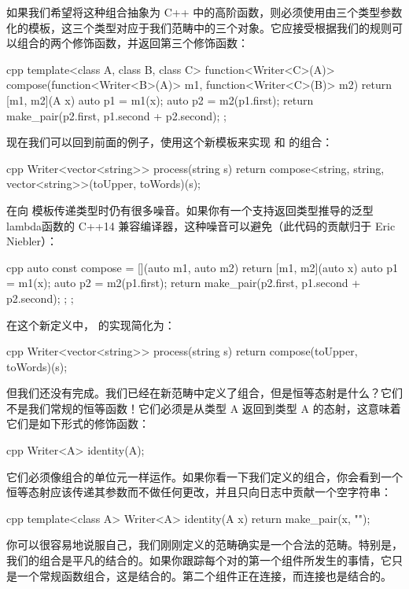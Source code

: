 如果我们希望将这种组合抽象为 C++ 中的高阶函数，则必须使用由三个类型参数化的模板，这三个类型对应于我们范畴中的三个对象。它应接受根据我们的规则可以组合的两个修饰函数，并返回第三个修饰函数：

\begin{snip}{cpp}
  template<class A, class B, class C>
  function<Writer<C>(A)> compose(function<Writer<B>(A)> m1,
  function<Writer<C>(B)> m2)
    {
    return [m1, m2](A x) {
      auto p1 = m1(x);
      auto p2 = m2(p1.first);
      return make_pair(p2.first, p1.second + p2.second);
    };
  }
\end{snip}
现在我们可以回到前面的例子，使用这个新模板来实现  和  的组合：

\begin{snip}{cpp}
  Writer<vector<string>> process(string s) {
    return compose<string, string, vector<string>>(toUpper, toWords)(s);
  }
\end{snip}
在向  模板传递类型时仍有很多噪音。如果你有一个支持返回类型推导的泛型lambda函数的 C++14 兼容编译器，这种噪音可以避免（此代码的贡献归于 Eric Niebler）：

\begin{snip}{cpp}
  auto const compose = [](auto m1, auto m2) {
    return [m1, m2](auto x) {
      auto p1 = m1(x);
      auto p2 = m2(p1.first);
      return make_pair(p2.first, p1.second + p2.second);
    };
  };
\end{snip}
在这个新定义中， 的实现简化为：

\begin{snip}{cpp}
  Writer<vector<string>> process(string s) {
    return compose(toUpper, toWords)(s);
  }
\end{snip}
但我们还没有完成。我们已经在新范畴中定义了组合，但是恒等态射是什么？它们不是我们常规的恒等函数！它们必须是从类型 A 返回到类型 A 的态射，这意味着它们是如下形式的修饰函数：

\begin{snip}{cpp}
  Writer<A> identity(A);
\end{snip}
它们必须像组合的单位元一样运作。如果你看一下我们定义的组合，你会看到一个恒等态射应该传递其参数而不做任何更改，并且只向日志中贡献一个空字符串：

\begin{snip}{cpp}
  template<class A> Writer<A> identity(A x) {
    return make_pair(x, "");
  }
\end{snip}
你可以很容易地说服自己，我们刚刚定义的范畴确实是一个合法的范畴。特别是，我们的组合是平凡的结合的。如果你跟踪每个对的第一个组件所发生的事情，它只是一个常规函数组合，这是结合的。第二个组件正在连接，而连接也是结合的。

